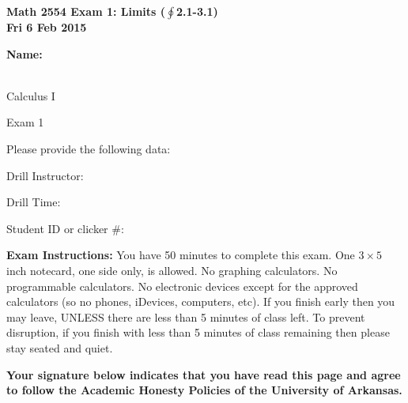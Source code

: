 \documentclass[12pt,letterpaper]{article}
\begin{document}
\flushleft
\begin{multicols}{2}

\textbf{Math 2554 Exam 1: Limits ($\oint$2.1-3.1) \\
Fri 6 Feb 2015}

\textbf{Name:  } \\

\vspace{1pc}
\underline{\hspace{43ex}} %
\\
\vspace{.5in}

\end{multicols}

\pagestyle{empty}

\flushleft

\begin{center}\LARGE Calculus I 

Exam 1 \end{center}

\vspace{1.5pc}
Please provide the following data:

\vspace{1.5pc}
Drill Instructor: \underline{\hspace{40ex}}

\vspace{1.5pc}
Drill Time: \underline{\hspace{40ex}}

\vspace{1.5pc}
Student ID or clicker \#: \underline{\hspace{40ex}}

\vspace{3pc}
{\bf Exam Instructions:} You have 50 minutes to complete this exam.  One $3\times 5$ inch notecard, one side only, is allowed.  No graphing calculators.  No programmable calculators.  No electronic devices except for the approved calculators (so no phones, iDevices, computers, etc).  If you finish early then you may leave, UNLESS there are less than 5 minutes of class left.  To prevent disruption, if you finish with less than 5 minutes of class remaining then please stay seated and quiet.

\vfill
\textbf{Your signature below indicates that you have read this page and agree to follow the Academic Honesty Policies of the University of Arkansas.}  
\end{document}
